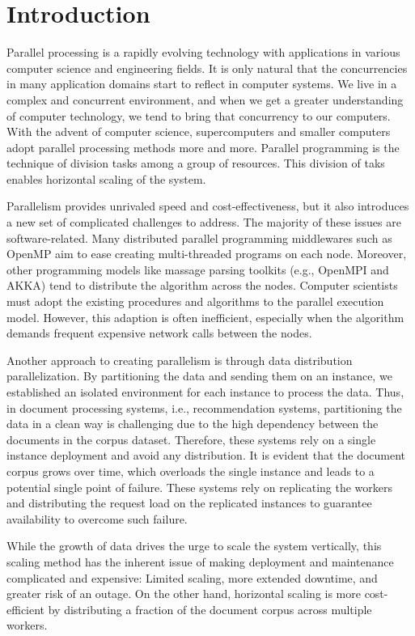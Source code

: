 \chapter{Introduction}

Parallel processing is a rapidly evolving technology with applications in various computer science and engineering fields. It is only natural that the concurrencies in many application domains start to reflect in computer systems. We live in a complex and concurrent environment, and when we get a greater understanding of computer technology, we tend to bring that concurrency to our computers. With the advent of computer science, supercomputers and smaller computers adopt parallel processing methods more and more. Parallel programming is the technique of division tasks among a group of resources. This division of taks enables horizontal scaling of the system.


Parallelism provides unrivaled speed and cost-effectiveness, but it also introduces a new set of complicated challenges to address. The majority of these issues are software-related. Many distributed parallel programming middlewares such as OpenMP aim to ease creating multi-threaded programs on each node. Moreover, other programming models like massage parsing toolkits (e.g., OpenMPI and AKKA) tend to distribute the algorithm across the nodes. Computer scientists must adopt the existing procedures and algorithms to the parallel execution model. However, this adaption is often inefficient, especially when the algorithm demands frequent expensive network calls between the nodes.


Another approach to creating parallelism is through data distribution parallelization. By partitioning the data and sending them on an instance, we established an isolated environment for each instance to process the data. Thus, in document processing systems, i.e., recommendation systems, partitioning the data in a clean way is challenging due to the high dependency between the documents in the corpus dataset. Therefore, these systems rely on a single instance deployment and avoid any distribution. It is evident that the document corpus grows over time, which overloads the single instance and leads to a potential single point of failure. These systems rely on replicating the workers and distributing the request load on the replicated instances to guarantee availability to overcome such failure.


While the growth of data drives the urge to scale the system vertically, this scaling method has the inherent issue of making deployment and maintenance complicated and expensive: Limited scaling, more extended downtime, and greater risk of an outage. On the other hand, horizontal scaling is more cost-efficient by distributing a fraction of the document corpus across multiple workers.


